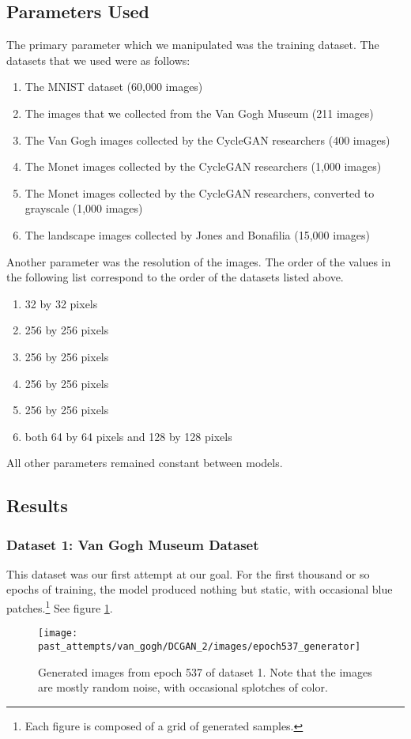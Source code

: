 \documentclass[11pt,letterpaper]{article}
\begin{document}
		\subsection{Parameters Used}
			The primary parameter which we manipulated was the training dataset.
			The datasets that we used were as follows:
			\begin{enumerate}
				\item The MNIST dataset (60,000 images)
				\item The images that we collected from the Van Gogh Museum (211 images)
				\item The Van Gogh images collected by the CycleGAN researchers (400 images)
				\item The Monet images collected by the CycleGAN researchers (1,000 images)
				\item The Monet images collected by the CycleGAN researchers, converted to grayscale (1,000 images)
				\item The landscape images collected by Jones and Bonafilia\cite{otherGanGogh} (15,000 images)
			\end{enumerate}
			Another parameter was the resolution of the images.
			The order of the values in the following list correspond to the order of the datasets listed above.
			\begin{enumerate}
				\item 32 by 32 pixels
				\item 256 by 256 pixels
				\item 256 by 256 pixels
				\item 256 by 256 pixels
				\item 256 by 256 pixels
				\item both 64 by 64 pixels and 128 by 128 pixels  %
			\end{enumerate}
			All other parameters remained constant between models.
		\subsection{Results}
			\subsubsection{Dataset 1: Van Gogh Museum Dataset}
				This dataset was our first attempt at our goal.
				For the first thousand or so epochs of training, the model produced nothing but static, with occasional blue patches.\footnote{Each figure is composed of a grid of generated samples.}
				See figure \ref{fig:vgm:epoch537generator}.
				\begin{figure}
					\centering
					\texttt{[image: past\_attempts/van\_gogh/DCGAN\_2/images/epoch537\_generator]}
					\caption[Van Gogh Museum dataset, epoch 537]{Generated images from epoch 537 of dataset 1. Note that the images are mostly random noise, with occasional splotches of color.}
					\label{fig:vgm:epoch537generator}
				\end{figure}
\end{document}
